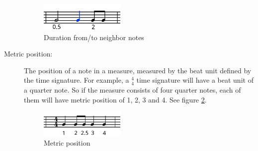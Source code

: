 \begin{description}
      \begin{figure}[tp]
         \begin{center}
            \includegraphics[width=0.4\textwidth]{fig/duration}
         \end{center}
         \caption{Duration from/to neighbor notes}
         \label{fig:duration}
      \end{figure}
   \item [Metric position:] The position of a note in a measure, measured by the beat unit defined by the time signature. For example, a $^4_4$ time signature will have a beat unit of a quarter note. So if the measure consists of four quarter notes, each of them will have metric position of 1, 2, 3 and 4. See figure \ref{fig:metrical}.

   \begin{figure}[tp]
      \begin{center}
         \includegraphics[width=0.4\textwidth]{fig/metrical}
      \end{center}
      \caption{Metric position}
      \label{fig:metrical}
   \end{figure}
      \end{description}

